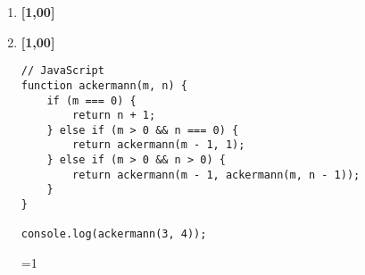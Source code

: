 \documentclass[a4paper]{article}
\newcommand{\gabarito}          {0}     %
\newcommand{\pt}                {1,00}  %
\newcommand{\ponto}[1]          {\textbf{[#1]}~}
\begin{document}
\begin{adjmulticols}{2}{0pt}{0pt}
\begin{enumerate}[resume=*questions,label={\arabic*.},leftmargin=*]
\begin{lstlisting}[style=HTML]
<!-- HTML -->
<!DOCTYPE html>
<html>
<head>
  <title>Exemplo</title>
</head>
<body>
  <h1>Olá, Mundo!</h1>
  <p>Exemplo de código HTML.</p>
</body>
</html>
\end{lstlisting}
  
  {\setlength{\columnsep}{0pt}\renewcommand{\columnseprule}{0pt}
  \begin{multicols}{2}
    \begin{answerlist}[label={\texttt{\Alph*}.},leftmargin=*]
      \ti[V.]
      \ifnum\gabarito=1\doneitem[F.]\else\ti[F.]\fi
    \end{answerlist}
  \end{multicols}
  }


    
    
    
    

  \item \rtask \ponto{\pt} \lipsum[1][1-1]
  
    \begin{answerlist}[label={\texttt{\Alph*}.},leftmargin=*]
      \ti \lipsum[1][1-1]
      
      \di \lipsum[1][1-1]
      
      \ti \lipsum[1][1-1]
      \ti \lipsum[1][1-1]
      \ti \lipsum[1][1-1]
    \end{answerlist}
    
    
    
    
    
  \item \rtask \ponto{\pt} \lipsum[1][1-1]
  
\begin{lstlisting}[style=JavaScript]
// JavaScript
function ackermann(m, n) {
    if (m === 0) {
        return n + 1;
    } else if (m > 0 && n === 0) {
        return ackermann(m - 1, 1);
    } else if (m > 0 && n > 0) {
        return ackermann(m - 1, ackermann(m, n - 1));
    }
}

console.log(ackermann(3, 4));
\end{lstlisting}
  
  {\setlength{\columnsep}{0pt}\renewcommand{\columnseprule}{0pt}
  \begin{multicols}{2}
    \begin{answerlist}[label={\texttt{\Alph*}.},leftmargin=*]
      \ti[V.]
      \ifnum\gabarito=1\doneitem[F.]\else\ti[F.]\fi
    \end{answerlist}
  \end{multicols}
  }
        


\end{enumerate}
\end{adjmulticols}
\end{document}
